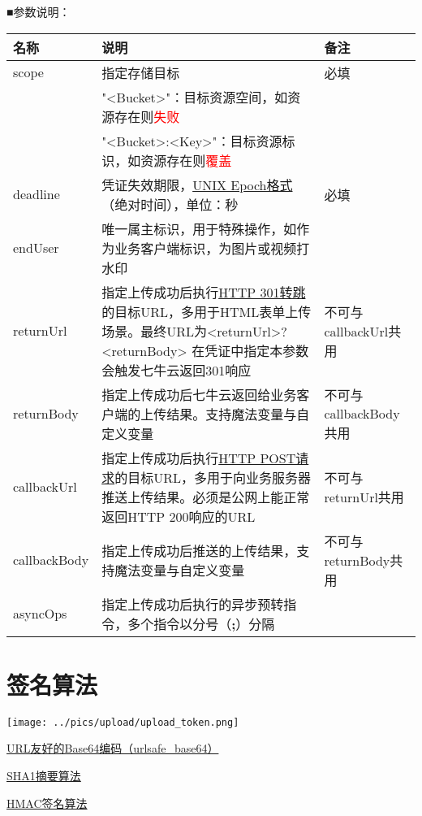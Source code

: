 \documentclass[11pt, oneside]{book}
\newcommand{\qblock}[1]{
\vspace{0.1em}
\noindent
#1\par
\vspace{0.1em}
}
\newcommand{\qtable}[1]{\footnotesize\vspace{0.5em}#1\vspace{0.5em}\normalsize}
\begin{document}
\clearpage

\qblock{■\thinspace 参数说明：}
\qtable{
\def\arraystretch{2}
\begin{tabular}{|l|p{25em}|p{8em}|}
\hline
名称 & 说明 & 备注 \\
\hline
scope & 指定存储目标 & 必填 \\
\cline{2-2}
      & "<Bucket>"：目标资源空间，如资源存在则\textcolor{red}{失败} & \\
\cline{2-2}
      & "<Bucket>:<Key>"：目标资源标识，如资源存在则\textcolor{red}{覆盖} & \\
\hline
deadline & 凭证失效期限，\href{http://en.wikipedia.org/wiki/Unix_time}{UNIX Epoch格式}（绝对时间），单位：秒 & 必填 \\
\hline
endUser & 唯一属主标识，用于特殊操作，如作为业务客户端标识，为图片或视频打水印 & \\
\hline
returnUrl & 指定上传成功后执行\href{http://en.wikipedia.org/wiki/HTTP_301}{HTTP 301转跳}的目标URL，多用于HTML表单上传场景。最终URL为<returnUrl>?<returnBody> \newline 在凭证中指定本参数会触发七牛云返回301响应 & 不可与callbackUrl共用 \\
\hline
returnBody & 指定上传成功后七牛云返回给业务客户端的上传结果。支持魔法变量与自定义变量 & 不可与callbackBody共用 \\
\hline
callbackUrl & 指定上传成功后执行\href{http://en.wikipedia.org/wiki/POST_(HTTP)}{HTTP POST请求}的目标URL，多用于向业务服务器推送上传结果。必须是公网上能正常返回HTTP 200响应的URL & 不可与returnUrl共用 \\
\hline
callbackBody & 指定上传成功后推送的上传结果，支持魔法变量与自定义变量 & 不可与returnBody共用 \\
\hline
asyncOps & 指定上传成功后执行的异步预转指令，多个指令以分号（{\bf ;}）分隔 & \\
\hline
\end{tabular}
}

\section{签名算法}

\begin{center}
\texttt{[image: ../pics/upload/upload\_token.png]}
\end{center}

\href{http://zh.wikipedia.org/wiki/Base64#.E5.9C.A8URL.E4.B8.AD.E7.9A.84.E5.BA.94.E7.94.A8}{URL友好的Base64编码（urlsafe\_base64）}\par
\href{http://en.wikipedia.org/wiki/SHA-1}{SHA1摘要算法}\par
\href{http://en.wikipedia.org/wiki/Hash-based_message_authentication_code}{HMAC签名算法}\par
\end{document}
